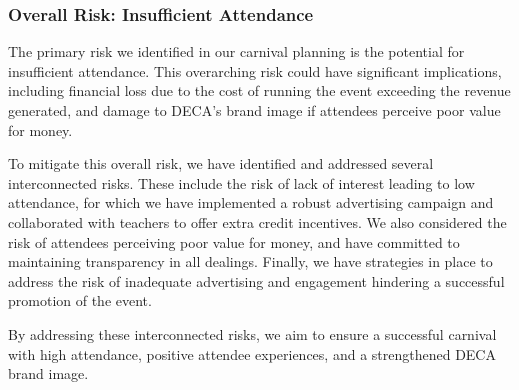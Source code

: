 \subsubsection{Overall Risk: Insufficient Attendance}

The primary risk we identified in our carnival planning is the potential for insufficient attendance. This overarching risk could have significant implications, including financial loss due to the cost of running the event exceeding the revenue generated, and damage to DECA's brand image if attendees perceive poor value for money.

To mitigate this overall risk, we have identified and addressed several interconnected risks. These include the risk of lack of interest leading to low attendance, for which we have implemented a robust advertising campaign and collaborated with teachers to offer extra credit incentives. We also considered the risk of attendees perceiving poor value for money, and have committed to maintaining transparency in all dealings. Finally, we have strategies in place to address the risk of inadequate advertising and engagement hindering a successful promotion of the event.

By addressing these interconnected risks, we aim to ensure a successful carnival with high attendance, positive attendee experiences, and a strengthened DECA brand image.
